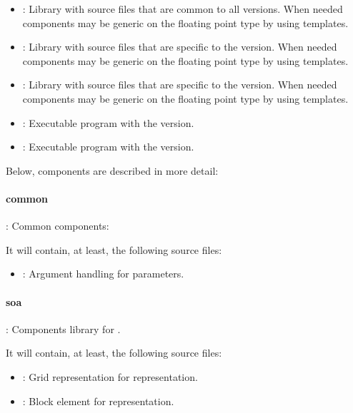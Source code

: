 \begin{itemize}
  \item {}: 
        Library with source files that are common to all versions.
        When needed components may be generic on the floating point type by using
        templates.

  \item {}: 
        Library with source files that are specific to the  version.
        When needed components may be generic on the floating point type by using
        templates.

  \item {}:
        Library with source files that are specific to the  version.
        When needed components may be generic on the floating point type by using
        templates.

  \item {}: 
        Executable program with the  version.

  \item {}: 
        Executable program with the  version.


\end{itemize}

Below, components are described in more detail:

\paragraph{common}: Common components:

It will contain, at least, the following source files:
\begin{itemize}
  \item {}: 
        Argument handling for  parameters. 
\end{itemize}

\paragraph{soa}: Components library for .

It will contain, at least, the following source files:
\begin{itemize}
  \item {}: 
        Grid representation for  representation.
  \item {}: 
        Block element for  representation.
\end{itemize}

